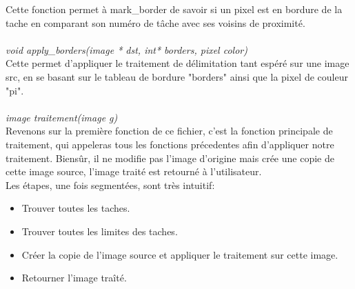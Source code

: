 \documentclass[12pt, letterpaper]{article}
\begin{document}
Cette fonction permet à mark\_border de savoir si un pixel est en bordure de la tache en comparant son numéro de tâche 
avec ses voisins de proximité.
\\\\
\textit{void apply\_borders(image * dst, int* borders, pixel color)}\\
Cette permet d'appliquer le traitement de délimitation tant espéré sur une image src, en se basant sur 
le tableau de bordure "borders" ainsi que la pixel de couleur "pi".
\\\\
\textit{image traitement(image g)}\\
Revenons sur la première fonction de ce fichier, c'est la fonction principale de traitement, qui appeleras tous les fonctions précedentes 
afin d'appliquer notre traitement. Biensûr, il ne modifie pas l'image d'origine mais crée une copie de cette image source, 
l'image traité est retourné à l'utilisateur.\\
Les étapes, une fois segmentées, sont très intuitif:\\
\begin{itemize}
    \item Trouver toutes les taches.
    \item Trouver toutes les limites des taches.
    \item Créer la copie de l'image source et appliquer le traitement sur cette image.
    \item Retourner l'image traîté.    
 \end{itemize}
\end{document}
